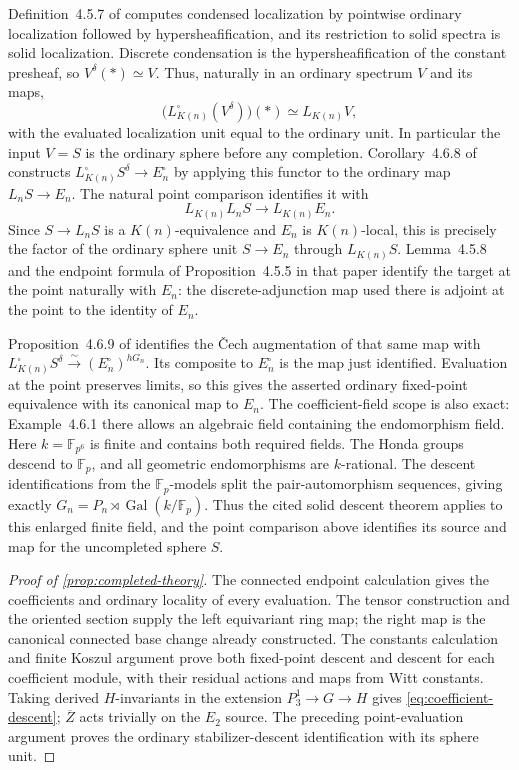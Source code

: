 \documentclass[11pt]{article}
\numberwithin{equation}{section}
\theoremstyle{definition}
\theoremstyle{remark}
\newcommand{\F}{\mathbb F}
\DeclareMathOperator{\Gal}{Gal}
\begin{document}
Definition~4.5.7 of \cite{BMR2026} computes condensed localization by
pointwise ordinary localization followed by hypersheafification, and its
restriction to solid spectra is solid localization. Discrete condensation
is the hypersheafification of the constant presheaf, so
\(V^\delta(*)\simeq V\). Thus, naturally in an ordinary spectrum \(V\)
and its maps,
\[
 \bigl(L_{K(n)}^\square(V^\delta)\bigr)(*)\simeq L_{K(n)}V,
\]
with the evaluated localization unit equal to the ordinary unit.
In particular the input \(V=S\) is the ordinary sphere before any
completion. Corollary~4.6.8 of \cite{BMR2026} constructs
\(L_{K(n)}^\square S^\delta\to E_n^\square\) by applying this functor
to the ordinary map \(L_nS\to E_n\). The natural point comparison
identifies it with
\[
 L_{K(n)}L_nS\longrightarrow L_{K(n)}E_n.
\]
Since \(S\to L_nS\) is a \(K(n)\)-equivalence and \(E_n\) is
\(K(n)\)-local, this is precisely the factor of the ordinary sphere
unit \(S\to E_n\) through \(L_{K(n)}S\). Lemma~4.5.8 and the endpoint
formula of Proposition~4.5.5 in that paper identify the target at the
point naturally with \(E_n\): the discrete-adjunction map used there is
adjoint at the point to the identity of \(E_n\).

Proposition~4.6.9 of \cite{BMR2026} identifies the \v Cech augmentation
of that same map with
\(L_{K(n)}^\square S^\delta\xrightarrow{\sim}(E_n^\square)^{hG_n}\).
Its composite to \(E_n^\square\) is the map just identified. Evaluation
at the point preserves limits, so this gives the asserted ordinary
fixed-point equivalence with its canonical map to \(E_n\).
The coefficient-field scope is also exact: Example~4.6.1 there allows an
algebraic field containing the endomorphism field. Here
\(k=\F_{p^6}\) is finite and contains both required fields. The Honda
groups descend to \(\F_p\), and all geometric endomorphisms are
\(k\)-rational. The descent identifications from the \(\F_p\)-models split
the pair-automorphism sequences, giving exactly
\(G_n=P_n\rtimes\Gal(k/\F_p)\). Thus the cited solid descent theorem
applies to this enlarged finite field, and the point comparison above
identifies its source and map for the uncompleted sphere \(S\).

\begin{proof}[Proof of \cref{prop:completed-theory}]
The connected endpoint calculation gives the coefficients and ordinary
locality of every evaluation. The tensor construction and the oriented
section supply the left equivariant ring map; the right map is the
canonical connected base change already constructed.
The constants calculation and finite Koszul
argument prove both fixed-point descent and descent for each coefficient
module, with their residual actions and maps from Witt constants.
Taking derived \(H\)-invariants in the extension
\(P_3^1\to G\to H\) gives \eqref{eq:coefficient-descent};
\(\overline Z\) acts trivially on the \(E_2\) source.
The preceding point-evaluation argument proves the ordinary
stabilizer-descent identification with its sphere unit.
\end{proof}
\end{document}
